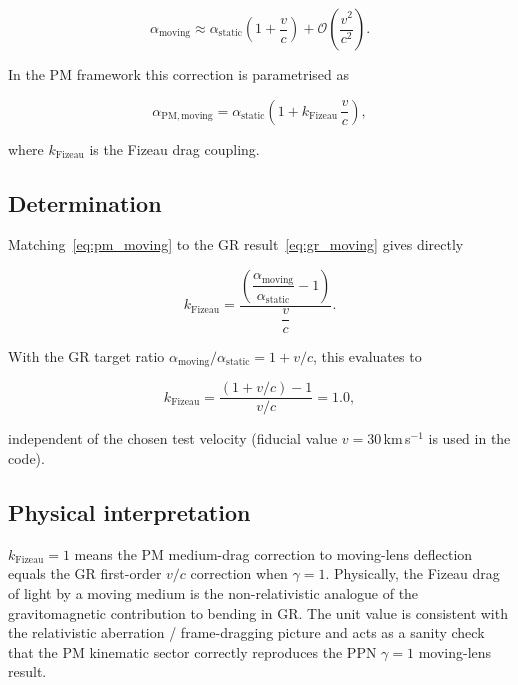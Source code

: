 \documentclass{article}
\begin{document}
\begin{equation}
  \alpha_{\mathrm{moving}} \approx \alpha_{\mathrm{static}}
  \left(1 + \frac{v}{c}\right) + \mathcal{O}\!\left(\frac{v^2}{c^2}\right).
  \label{eq:gr_moving}
\end{equation}

In the PM framework this correction is parametrised as

\begin{equation}
  \alpha_{\mathrm{PM,moving}} = \alpha_{\mathrm{static}}
  \left(1 + k_{\mathrm{Fizeau}}\,\frac{v}{c}\right),
  \label{eq:pm_moving}
\end{equation}

where $k_{\mathrm{Fizeau}}$ is the Fizeau drag coupling.

\subsection{Determination}

Matching~\eqref{eq:pm_moving} to the GR result~\eqref{eq:gr_moving} gives
directly

\begin{equation}
  k_{\mathrm{Fizeau}} = \frac{\left(\dfrac{\alpha_{\mathrm{moving}}}
                                          {\alpha_{\mathrm{static}}} - 1\right)}
                              {\dfrac{v}{c}}.
  \label{eq:kFizeau_def}
\end{equation}

With the GR target ratio $\alpha_{\mathrm{moving}}/\alpha_{\mathrm{static}}
= 1 + v/c$, this evaluates to

\begin{equation}
  k_{\mathrm{Fizeau}}
  = \frac{(1 + v/c) - 1}{v/c}
  = 1.0,
  \label{eq:kFizeau_result}
\end{equation}

independent of the chosen test velocity (fiducial value $v = 30$\,km\,s$^{-1}$
is used in the code).

\subsection{Physical interpretation}

$k_{\mathrm{Fizeau}} = 1$ means the PM medium-drag correction to moving-lens
deflection equals the GR first-order $v/c$ correction when $\gamma = 1$.
Physically, the Fizeau drag of light by a moving medium is the non-relativistic
analogue of the gravitomagnetic contribution to bending in GR.  The unit value
is consistent with the relativistic aberration / frame-dragging picture and
acts as a sanity check that the PM kinematic sector correctly reproduces the
PPN $\gamma = 1$ moving-lens result.  
\end{document}
